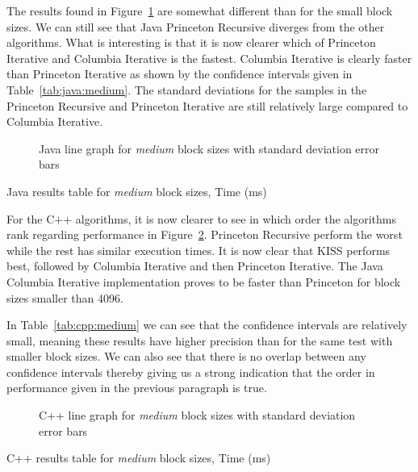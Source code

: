 The results found in Figure~\ref{fig:java:line:medium} are somewhat different than for the small block sizes. We can still see that Java Princeton Recursive diverges from the other algorithms. What is interesting is that it is now clearer which of Princeton Iterative and Columbia Iterative is the fastest. Columbia Iterative is clearly faster than Princeton Iterative as shown by the confidence intervals given in Table~\ref{tab:java:medium}. The standard deviations for the samples in the Princeton Recursive and Princeton Iterative are still relatively large compared to Columbia Iterative.

\begin{figure}
    \centering
    
    \caption{Java line graph for \emph{medium} block sizes with standard deviation error bars}
    \label{fig:java:line:medium}
\end{figure}
\begin{table}
    \centering
    \caption{Java results table for \emph{medium} block sizes, Time (ms)}
    \label{tab:java:medium}
    
\end{table}

For the C++ algorithms, it is now clearer to see in which order the algorithms rank regarding performance in Figure~\ref{fig:cpp:line:medium}. Princeton Recursive perform the worst while the rest has similar execution times. It is now clear that KISS performs best, followed by Columbia Iterative and then Princeton Iterative. The Java Columbia Iterative implementation proves to be faster than Princeton for block sizes smaller than 4096.

In Table~\ref{tab:cpp:medium} we can see that the confidence intervals are relatively small, meaning these results have higher precision than for the same test with smaller block sizes. We can also see that there is no overlap between any confidence intervals thereby giving us a strong indication that the order in performance given in the previous paragraph is true.

\begin{figure}
    \centering
    
    \caption{C++ line graph for \emph{medium} block sizes with standard deviation error bars}
    \label{fig:cpp:line:medium}
\end{figure}
\begin{table}
    \centering
    \caption{C++ results table for \emph{medium} block sizes, Time (ms)}
    \label{tab:cpp:medium}
    \resizebox{\columnwidth}{!}{
        
    }
\end{table}

